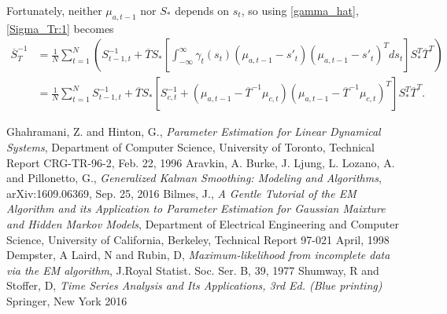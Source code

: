 \documentclass[12pt,leqno]{article}
\begin{document}
Fortunately, neither $\mu_{a,t-1}$ nor $S_*$ depends on $s_t$,
so using \eqref{gamma_hat}, \eqref{Sigma_Tr:1} becomes
\begin{equation}\label{S_Tr:2}
  \begin{split}
  \overline{S}_T^{-1} &=\frac{1}{N}\sum_{t=1}^N\left(S_{t-1,t}^{-1} + \overline{T}S_*
  \left[\int_{-\infty}^{\infty}\gamma_t(s_t)(\mu_{a,t-1}-s'_t)(\mu_{a,t-1}-s'_t)^Tds_t\right]S_*^T\overline{T}^T\right)\\
   &=\frac{1}{N}\sum_{t=1}^NS_{t-1,t}^{-1} + \overline{T}S_*
           [S_{c,t}^{-1}+(\mu_{a,t-1}-\overline{T}^{-1}\mu_{c,t})(\mu_{a,t-1}-\overline{T}^{-1}\mu_{c,t})^T]
           S_*^T\overline{T}^T.
  \end{split}
\end{equation}
\newpage
\begin{thebibliography}{9}
  Ghahramani, Z. and Hinton, G.,
  \emph{Parameter Estimation for Linear Dynamical Systems},
  Department of Computer Science, University of Toronto,
  Technical Report CRG-TR-96-2,
  Feb. 22, 1996
  Aravkin, A. Burke, J. Ljung, L. Lozano, A. and Pillonetto, G.,
  \emph{Generalized Kalman Smoothing: Modeling and Algorithms},
  arXiv:1609.06369,
  Sep. 25, 2016
  Bilmes, J.,
  \emph{A Gentle Tutorial of the EM Algorithm and its Application to Parameter Estimation
    for Gaussian Maixture and Hidden Markov Models},
  Department of Electrical Engineering and Computer Science, University of California, Berkeley,
  Technical Report 97-021
  April, 1998
  Dempster, A Laird, N and Rubin, D,
  \emph{Maximum-likelihood from incomplete data via the EM algorithm},
  J.Royal Statist. Soc. Ser. B, 39,
  1977
  Shumway, R and Stoffer, D,
  \emph{Time Series Analysis and Its Applications, 3rd Ed. (Blue printing)}
  Springer, New York 2016
    
\end{thebibliography}
\end{document}
